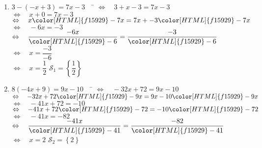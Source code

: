 \documentclass[a4paper,11pt,exos]{nsi} %
\begin{document}
\begin{enumerate}
    \item 	\begin{tabbing}
        $ 3-(-x+3)=7x-3 \quad$		\=	$\Leftrightarrow\quad 3+x-3=7x-3 $\\
        \>	$\Leftrightarrow\quad   x+0=7x-3 $\\
        \>	$\Leftrightarrow\quad   x{\color[HTML]{f15929}-7x}=7x+-3{\color[HTML]{f15929}-7x} $\\
        \>	$\Leftrightarrow\quad   -6x=-3 $\\
        \>	$\Leftrightarrow\quad	\dfrac{-6x}{\color[HTML]{f15929}-6}=\dfrac{-3}{\color[HTML]{f15929}-6} $\\[.5em]
        \>	$\Leftrightarrow\quad	x=\dfrac{-3}{-6} $\\[.5em]
        \>	$\Leftrightarrow\quad	x=\dfrac{1}{2} $ \hspace{4cm} $\mathcal{S}_1=\left\{ \dfrac{1}{2} \right\}$
    \end{tabbing}	
    
            
    \item 	\begin{tabbing}
        $ 8(-4x+9)=9x-10 \quad$		\=	$\Leftrightarrow\quad -32x+72=9x-10 $\\
        \>	$\Leftrightarrow\quad   -32x+72{\color[HTML]{f15929}-9x}=9x-10{\color[HTML]{f15929}-9x} $\\
        \>	$\Leftrightarrow\quad   -41x+72=-10 $\\
        \>	$\Leftrightarrow\quad   -41x+72{\color[HTML]{f15929}-72}=-10{\color[HTML]{f15929}-72} $\\
        \>	$\Leftrightarrow\quad   -41x=-82 $\\
        \>	$\Leftrightarrow\quad	\dfrac{-41x}{\color[HTML]{f15929}-41}=\dfrac{-82}{\color[HTML]{f15929}-41} $\\[.5em]
        \>	$\Leftrightarrow\quad	x=2 $ \hspace{4cm} $\mathcal{S}_2=\left\{ 2 \right\}$
    \end{tabbing}



\end{enumerate}
\end{document}
